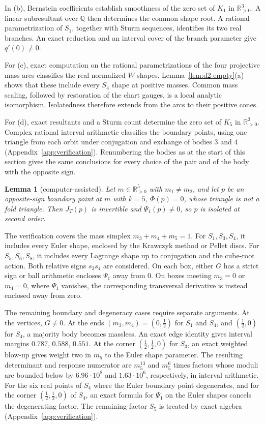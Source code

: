 \documentclass[Threeside,11pt]{article}
\newtheorem{lemma}[theorem]{Lemma}
\theoremstyle{definition}
\theoremstyle{remark}
\numberwithin{equation}{section}
\theoremstyle{remark}
\newcommand{\Rp}{\mathbb{R}_{>0}}
\begin{document}
{In (b), Bernstein coefficients establish smoothness of the zero set
of $K_1$ in $\Rp^3$.  A linear subresultant over $\mathbb Q$ then determines the common
shape root.  A rational parametrization of $S_1$, together with Sturm sequences,
identifies its two real branches.  An exact reduction and an interval cover of the
branch parameter give $q'(0)\ne0$.

For (c), exact computation on the rational parametrizations of the four projective mass
arcs classifies the real normalized $W$-shapes.  Lemma~\ref{lem:d2-empty}(a) shows that
these include every $S_4$ shape at positive masses.
Common mass scaling, followed by restoration of the chart gauges, is a local analytic
isomorphism.  Isolatedness therefore extends from the arcs to their positive cones.

For (d), exact resultants and a Sturm count determine the zero set of $K_5$ in $\Rp^3$.
Complex rational interval arithmetic classifies the boundary points, using one triangle from
each orbit under conjugation and exchange of bodies $3$ and $4$
(Appendix~\ref{app:verification}).
Renumbering the bodies as at the start of this section gives the same conclusions for
every choice of the pair and of the body with the opposite sign.}

\begin{lemma}[computer-assisted]\label{lem:d2-P}
Let $m\in\Rp^5$ with $m_1\ne m_2$, and let $p$ be an opposite-sign boundary point at $m$ with $k=5$,
$\Phi(p)=0$, whose triangle is not a fold triangle.  Then $J_T(p)$ is invertible and
$\Psi_1(p)\ne0$, so $p$ is isolated at second order.
\end{lemma}

{The verification covers the mass simplex $m_3+m_4+m_5=1$.
For $S_1,S_3,S_4$, it includes every Euler shape, enclosed by the Krawczyk method or
Pellet discs.  For $S_5,S_6,S_8$, it includes every Lagrange shape up to conjugation and
the cube-root action.  Both relative signs $s_3s_4$ are considered.
On each box, either $G$ has a strict sign or ball arithmetic encloses $\Psi_1$ away from
$0$.  On boxes meeting $m_3=0$ or $m_4=0$, where $\Psi_1$ vanishes, the corresponding
transversal derivative is instead enclosed away from zero.}

{The remaining boundary and degeneracy cases require separate arguments.
At the vertices, $G\ne0$.
At the ends $(m_3,m_4)=(0,\frac12)$ for $S_1$ and $S_4$, and $(\frac12,0)$ for $S_4$, a
majority body becomes massless.  An exact edge identity gives interval margins
$0.787$, $0.588$, $0.551$.
At the corner $(\frac12,\frac12,0)$ for $S_3$, an exact weighted blow-up gives weight
two in $m_5$ to the Euler shape parameter.  The resulting determinant and response
numerator are $m_5^{13}$ and $m_5^6$ times factors whose moduli are bounded below by
$6.96\cdot10^8$ and $1.63\cdot10^6$, respectively, in interval arithmetic.
For the six real points of $S_4$ where the Euler boundary point degenerates, and for the corner
$(\frac12,\frac12,0)$ of $S_4$, an exact formula for $\Psi_1$ on the Euler shapes cancels
the degenerating factor.
The remaining factor $S_5$ is treated by exact algebra (Appendix~\ref{app:verification}).}
\end{document}
